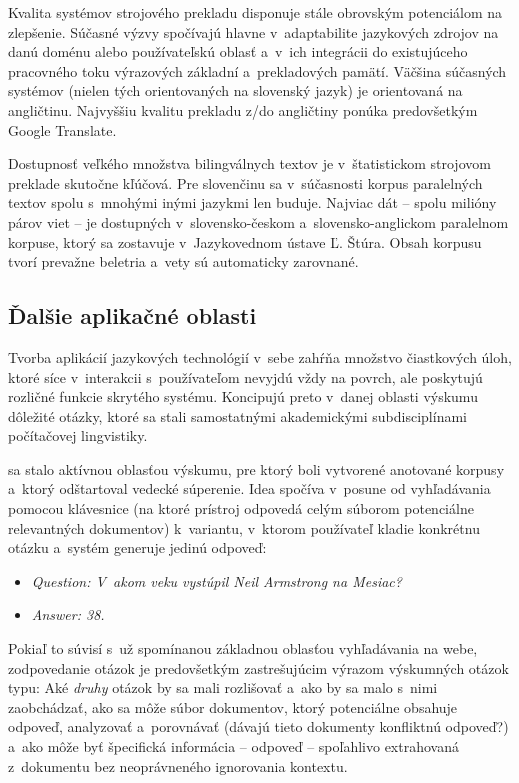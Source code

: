 \begin{multicols}{2}
Kvalita systémov strojového prekladu disponuje stále obrovským
potenciálom na zlepšenie. Súčasné výzvy spočívajú hlavne
v~adaptabilite jazykových zdrojov na danú doménu alebo
používateľskú oblasť a~v~ich integrácii do existujúceho
pracovného toku výrazových základní a~prekladových pamätí.
Väčšina súčasných systémov (nielen tých orientovaných na
slovenský jazyk) je orientovaná na angličtinu. Najvyššiu kvalitu
prekladu z/do angličtiny ponúka predovšetkým Google Translate. 


Dostupnosť veľkého množstva bilingválnych textov je v~štatistickom
strojovom preklade skutočne kľúčová. Pre slovenčinu sa
v~súčasnosti korpus paralelných textov spolu s~mnohými inými
jazykmi len buduje. Najviac dát -- spolu milióny párov viet -- je
dostupných v~slovensko-českom a~slovensko-anglickom paralelnom
korpuse, ktorý sa zostavuje v~Jazykovednom ústave Ľ. Štúra. Obsah
korpusu tvorí prevažne beletria a~vety sú automaticky zarovnané.

\subsection{Ďalšie aplikačné oblasti}
Tvorba aplikácií jazykových technológií v~sebe zahŕňa množstvo čiastkových úloh, ktoré síce v~interakcii s~používateľom nevyjdú vždy na povrch, ale poskytujú rozličné funkcie skrytého systému. Koncipujú preto v~danej oblasti výskumu dôležité otázky, ktoré sa stali samostatnými akademickými subdisciplínami počítačovej lingvistiky.

 sa stalo aktívnou oblasťou výskumu,
pre ktorý boli vytvorené anotované korpusy a~ktorý odštartoval
vedecké súperenie. Idea spočíva v~posune od vyhľadávania pomocou
klávesnice (na ktoré prístroj odpovedá celým súborom potenciálne
relevantných dokumentov) k~variantu, v~ktorom používateľ kladie
konkrétnu otázku a~systém generuje jedinú odpoveď:
\begin{itemize}
	\item[] \textit{Question: V~akom veku
vystúpil Neil Armstrong na Mesiac?}
	\item[] \textit{Answer: 38.}
\end{itemize}
Pokiaľ to súvisí
s~už spomínanou základnou oblasťou vyhľadávania na webe,
zodpovedanie otázok je predovšetkým zastrešujúcim výrazom
výskumných otázok typu: Aké \emph{druhy} otázok by sa mali
rozlišovať a~ako by sa malo s~nimi zaobchádzať, ako sa môže súbor
dokumentov, ktorý potenciálne obsahuje odpoveď, analyzovať
a~porovnávať (dávajú tieto dokumenty konfliktnú odpoveď?) a~ako
môže byť špecifická informácia – odpoveď – spoľahlivo
extrahovaná z~dokumentu bez neoprávneného ignorovania kontextu. 


\end{multicols}
